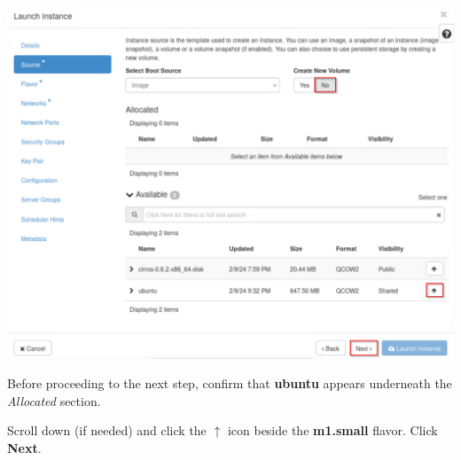 \documentclass[letterpaper, 12pt]{article}
\begin{document}
\begin{enumerate}
\begin{labstep}
        \begin{center}
            \includegraphics[width=\linewidth]{images/part1/step7.png}
        \end{center}
    \end{labstep}

    \begin{stopbox}
        Before proceeding to the next step, confirm that \textbf{ubuntu} appears underneath the \textit{Allocated} section.
    \end{stopbox}

    \begin{labstep}
        Scroll down (if needed) and click the $\uparrow$ icon beside the \textbf{m1.small} flavor.
        Click \textbf{Next}.


\end{labstep}
\end{enumerate}
\end{document}
